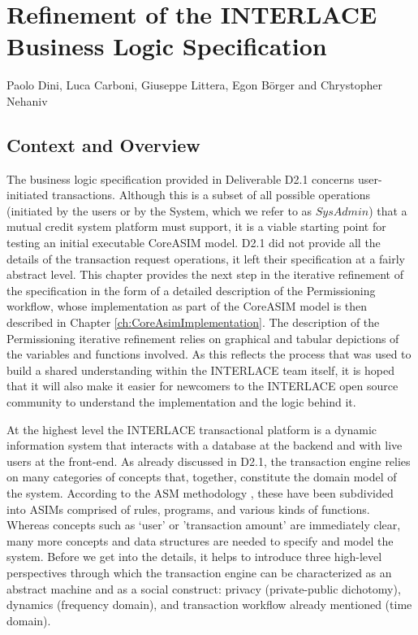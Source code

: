 \chapter{Refinement of the INTERLACE Business Logic Specification}
\label{ch:UpdateBLS}

\vspace{-1cm}
\begin{center}
Paolo Dini, Luca Carboni, Giuseppe Littera, Egon B\"orger and Chrystopher Nehaniv
\end{center}

\section{Context and Overview}
The business logic specification provided in Deliverable D2.1 \cite{INTERLACE_D21} concerns user-initiated transactions. Although this is a subset of all possible operations (initiated by the users or by the System, which we refer to as $SysAdmin$) that a mutual credit system platform must support, it is a viable starting point for testing an initial executable CoreASIM model. D2.1 did not provide all the details of the transaction request operations, it left their specification at a fairly abstract level. This chapter provides the next step in the iterative refinement of the specification in the form of a detailed description of the Permissioning workflow, whose implementation as part of the CoreASIM model is then described in Chapter \ref{ch:CoreAsimImplementation}. The description of the Permissioning iterative refinement relies on graphical and tabular depictions of the variables and functions involved. As this reflects the process that was used to build a shared understanding within the INTERLACE team itself, it is hoped that it will also make it easier for newcomers to the INTERLACE open source community to understand the implementation and the logic behind it.

At the highest level the INTERLACE transactional platform is a dynamic information system that interacts with a database at the backend and with live users at the front-end. As already discussed in D2.1, the transaction engine relies on many categories of concepts that, together, constitute the domain model of the system. According to the ASM methodology \cite{BoergerStaerk2003,BoergerRaschke2018}, these have been subdivided into ASIMs comprised of rules, programs, and various kinds of functions. Whereas concepts such as `user' or 'transaction amount' are immediately clear, many more concepts and data structures are needed to specify and model the system. Before we get into the details, it helps to introduce three high-level perspectives through which the transaction engine can be characterized as an abstract machine and as a social construct: privacy (private-public dichotomy), dynamics (frequency domain), and transaction workflow already mentioned (time domain).

